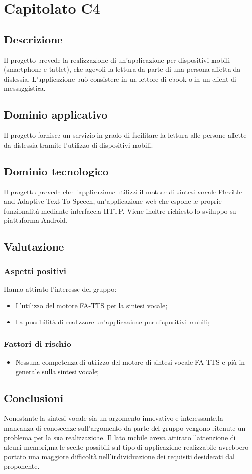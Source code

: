 \section {Capitolato C4}
	\subsection {Descrizione}
	Il progetto prevede la realizzazione di un'applicazione per dispositivi mobili (smartphone e tablet), che agevoli la
lettura da parte di una persona affetta da dislessia.  L'applicazione può consistere in un lettore di ebook o in un
client di messaggistica.
	\subsection {Dominio applicativo}
	Il progetto fornisce un servizio in grado di facilitare la lettura alle persone affette da dislessia tramite l'utilizzo di dispositivi mobili. 
	\subsection {Dominio tecnologico}
Il progetto prevede che l'applicazione utilizzi il motore di sintesi vocale Flexible and Adaptive Text To Speech, un'applicazione web che
espone le proprie funzionalità mediante interfaccia HTTP. Viene inoltre richiesto lo sviluppo su piattaforma Android.
	\subsection {Valutazione}
			\subsubsection {Aspetti positivi}
			Hanno attirato l'interesse del gruppo:
				\begin {itemize}
				  \item L'utilizzo del motore FA-TTS per la sintesi vocale;
				  \item La possibilità di realizzare un'applicazione per dispositivi mobili;			
				\end {itemize}
			\subsubsection {Fattori di rischio}
				\begin {itemize}
					\item Nessuna competenza di utilizzo del motore di sintesi vocale FA-TTS e più in generale sulla sintesi vocale;
				\end {itemize}
	\subsection {Conclusioni}
		Nonostante la sintesi vocale sia un argomento innovativo e interessante,la mancanza di conoscenze sull'argomento da parte del gruppo vengono ritenute un problema per la sua realizzazione. Il lato mobile aveva attirato l'attenzione di alcuni membri,ma le scelte possibili sul tipo di applicazione realizzabile avrebbero portato una maggiore difficoltà nell'individuazione dei requisiti desiderati dal proponente.